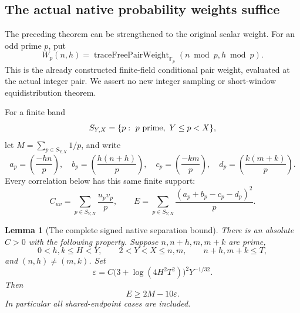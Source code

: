 \documentclass[11pt]{article}
\newtheorem{lemma}[theorem]{Lemma}
\begin{document}
\subsection{The actual native probability weights suffice}
\label{sec:native-integer-return}

The preceding theorem can be strengthened to the original scalar weight.
For an odd prime \(p\), put
\[
 W_p(n,h)=\operatorname{traceFreePairWeight}_{\mathbb F_p}
                         (n\bmod p,h\bmod p).
\]
This is the already constructed finite-field conditional pair weight,
evaluated at the actual integer pair.  We assert no new integer sampling
or short-window equidistribution theorem.

For a finite band
\[
 S_{Y,X}=\{p:\ p\ {\rm prime},\ Y\le p<X\},
\]
let \(M=\sum_{p\in S_{Y,X}}1/p\), and write
\[
 a_p=\left(\frac{-hn}{p}\right),\quad
 b_p=\left(\frac{h(n+h)}p\right),\quad
 c_p=\left(\frac{-km}{p}\right),\quad
 d_p=\left(\frac{k(m+k)}p\right).
\]
Every correlation below has this same finite support:
\[
 C_{uv}=\sum_{p\in S_{Y,X}}\frac{u_pv_p}p,\qquad
 E=\sum_{p\in S_{Y,X}}\frac{(a_p+b_p-c_p-d_p)^2}p.
\]

\begin{lemma}[The complete signed native separation bound]
\label{lem:native-signed-energy}
There is an absolute \(C>0\) with the following property.
Suppose \(n,n+h,m,m+k\) are prime,
\[
 0<h,k\le H<Y,\qquad 2<Y<X\le n,m,\qquad
                  n+h,m+k\le T,
\]
and \((n,h)\ne(m,k)\). Set
\[
 \varepsilon=
 C\bigl(3+\log(4H^2T^2)\bigr)^2Y^{-1/32}.
\]
Then
\begin{equation}\label{eq:native-energy-lower}
                         E\ge2M-10\varepsilon.
\end{equation}
In particular all shared-endpoint cases are included.
\end{lemma}
\end{document}

